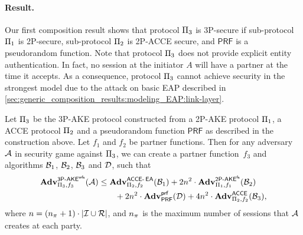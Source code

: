 \paragraph{Result.}
Our first composition result shows that protocol $\protocol_3$ is 3P-\akewfstext secure
if sub-protocol $\protocol_1$ is 2P-\akefstext secure,
sub-protocol $\protocol_2$ is 2P-ACCE secure,
and $\mathsf{PRF}$ is a pseudorandom function.
Note that protocol  $\protocol_3$ does not provide explicit entity authentication.
In fact,
no session at the initiator $A$ will have a partner at the time it accepts.
As a consequence,
protocol $\protocol_3$ cannot achieve security in the strongest \akefstext model due to the attack on basic EAP described in \cref{sec:generic_composition_results:modeling_EAP:link-layer}.

%
%




\begin{theorem}\label{thm:protocol_3:3P-AKE-}
Let $\protocol_3$ be the 3P-AKE protocol constructed from a 2P-AKE protocol $\protocol_1$, a ACCE protocol $\protocol_2$ and a pseudorandom function $\mathsf{PRF}$ as described in the construction above.
Let $f_1$ and $f_2$ be partner functions.
Then for any adversary $\A$ in security game \akewfstext against $\protocol_3$,
we can create a partner function~$f_3$
and algorithms $\A[B]_1$, $\A[B]_2$, $\A[B]_3$ and $\A[D]$,
such that
\begin{align}\label{eq:thm:P3}
	\begin{split}
	\adv_{\protocol_3,f_3}^{\operatorname{\mathsf{3P-}\akewfs}} (\A) 
	&\leq \adv_{\protocol_2,f_2}^{\operatorname{\mathsf{\acce-\EA}}}(\A[B]_1) 
		+ 2n^2 \cdot \adv_{\protocol_1,f_1}^{\operatorname{\mathsf{2P-}\akefs}}(\A[B]_2) \\
	&\qquad + 2n^2 \cdot \adv_{\mathsf{PRF}}^{\prf}(\A[D]) 
		+ 4 n^2 \cdot \adv_{\protocol_2,f_2}^{\acce}(\A[B]_3) ,			
	\end{split}
\end{align} 
where $n = (\numsessions+1) \cdot \left| \mathcal{I} \cup \mathcal{R} \right|$,
and $\numsessions$  is the maximum number of sessions that $\A$ creates at each party.
\end{theorem}

